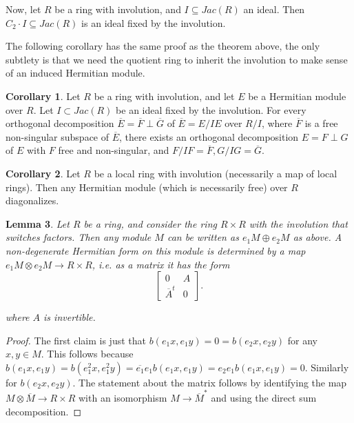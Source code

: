 \documentclass[edeposit,fullpage]{uiucthesis2009}
\theoremstyle{plain}
\newtheorem{lemma}{Lemma}
\numberwithin{lemma}{section}
\theoremstyle{definition}
\newtheorem{corollary}[lemma]{Corollary}
\begin{document}
Now, let $R$ be a ring with involution, and $I \subseteq Jac(R)$ an
ideal. Then $C_2\cdot I \subseteq Jac(R)$ is an ideal fixed by the
involution. 

The following corollary has the same proof as the theorem above, the
only subtlety is that we need the quotient ring to inherit the
involution to make sense of an induced Hermitian module.

\begin{corollary}\label{cor:semiloc_quot_form}
Let $R$ be a ring with involution, and let $E$ be a Hermitian module over
$R$. Let $I \subset Jac(R)$ be an ideal fixed by the involution. For every orthogonal decomposition $\overline E = \overline F
\perp \overline G$ of $\overline E = E/IE$ over $R/I$, where $\overline
F$ is a free non-singular subspace of $\overline E$, there exists an
orthogonal decomposition $E = F \perp G$ of $E$ with $F$ free and
non-singular, and $F/IF = \overline F, G/IG = \overline G$.
\end{corollary}

\begin{corollary}
Let $R$ be a local ring with involution (necessarily a map of local
rings). Then any Hermitian module (which is necessarily free)
over $R$ diagonalizes. 
\end{corollary}

\begin{lemma} 
Let $R$ be a ring, and consider the ring $R \times R$ with the
involution that switches factors. Then any module $M$ can be
written as $e_1M \oplus e_2M$ as above. A non-degenerate Hermitian form on this
module is determined by a map $e_1M \otimes e_2M \rightarrow R \times
R$, i.e. as a matrix it has the form
\[
\begin{bmatrix}
0 & A \\
\overline{A}^t & 0
\end{bmatrix}.
\]

where $A$ is invertible. 
\end{lemma}

\begin{proof}
The first claim is just that $b(e_1x,e_1y) = 0 = b(e_2x,e_2y)$ for any
$x,y \in M$. This follows because $b(e_1x,e_1y) = b(e_1^2x,e_1^2y) =
\overline{e_1}e_1b(e_1x,e_1y) = e_2e_1b(e_1x,e_1y) = 0$. Similarly for
$b(e_2x,e_2y)$. The statement about the matrix follows by identifying
the map $M \otimes \overline M \rightarrow R \times R$ with an isomorphism $M
\rightarrow \overline M^*$ and using the direct sum decomposition. 
\end{proof}
\end{document}
